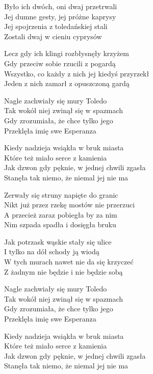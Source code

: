 \begin{text}
    \hfill\break
Było ich dwóch, oni dwaj przetrwali\\
Jej dumne gesty, jej próżne kaprysy\\
Jej spojrzenia z toledańskiej stali\\
Zostali dwaj w cieniu cyprysów

Lecz gdy ich klingi rozbłysnęły krzyżem\\
Gdy przeciw sobie rzucili z pogardą\\
Wszystko, co każdy z nich jej kiedyś przyrzekł\\
Jeden z nich zamarł z opuszczoną gardą

Nagle zachwiały się mury Toledo\\
Tak wokół niej zwinął się w spazmach\\
Gdy zrozumiała, że chce tylko jego\\
Przeklęła imię swe Esperanza

Kiedy nadzieja wsiąkła w bruk miasta\\
Które też miało serce z kamienia\\
Jak dzwon gdy pęknie, w jednej chwili zgasła\\
Stanęła tak niemo, że niemal jej nie ma

Zerwały się struny napięte do granic\\
Nikt już przez rzekę mostów nie przerzuci\\
A przecież zaraz pobiegła by za nim\\
Nim szpada spadła i dosięgła bruku

Jak potrzask wąskie stały się ulice\\
I tylko na dół schody ją wiodą\\
W tych murach nawet nie da się krzyczeć\\
Z żadnym nie będzie i nie będzie sobą

Nagle zachwiały się mury Toledo\\
Tak wokół niej zwinął się w spazmach\\
Gdy zrozumiała, że chce tylko jego\\
Przeklęła imię swe Esperanza

Kiedy nadzieja wsiąkła w bruk miasta\\
Które też miało serce z kamienia\\
Jak dzwon gdy pęknie, w jednej chwili zgasła\\
Stanęła tak niemo, że niemal jej nie ma
\end{text}
